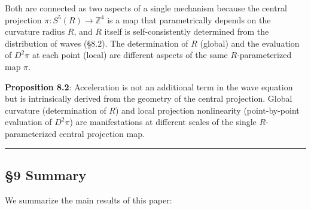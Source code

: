 \documentclass[
  a4paper,11pt]{article}
\theoremstyle{definition}
\theoremstyle{remark}
\begin{document}
Both are connected as two aspects of a single mechanism because the
central projection \(\pi: S^5(R) \to \mathbb{Z}^4\) is a map that
parametrically depends on the curvature radius \(R\), and \(R\) itself
is self-consistently determined from the distribution of waves (§8.2).
The determination of \(R\) (global) and the evaluation of \(D^2\pi\) at
each point (local) are different aspects of the same \(R\)-parameterized
map \(\pi\).

\textbf{Proposition 8.2}: Acceleration is not an additional term in the
wave equation but is intrinsically derived from the geometry of the
central projection. Global curvature (determination of \(R\)) and local
projection nonlinearity (point-by-point evaluation of \(D^2\pi\)) are
manifestations at different scales of the single \(R\)-parameterized
central projection map.

\begin{center}\rule{0.5\linewidth}{0.5pt}\end{center}

\subsection{§9 Summary}\label{summary}

We summarize the main results of this paper:
\end{document}
